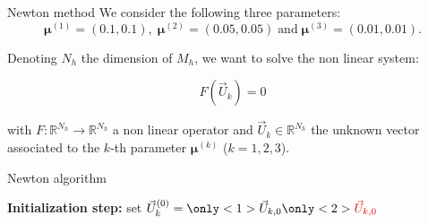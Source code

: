 \begin{frame}{Newton method}
	We consider the following three parameters:
	$$\bm{\mu}^{(1)} = (0.1,0.1), \; \bm{\mu}^{(2)} = (0.05,0.05) \; \text{and} \; \bm{\mu}^{(3)} = (0.01,0.01).$$

	Denoting $N_h$ the dimension of $M_h$, we want to solve the non linear system: %

    \normalsize
    \vspace{-10pt}
    \begin{equation*}
        F(\vec{U}_k) = 0 
    \end{equation*}

    with $F:\mathbb{R}^{N_h} \to \mathbb{R}^{N_h}$ a non linear operator and $\vec{U}_k\in \mathbb{R}^{N_h}$ the unknown vector associated to the $k$-th parameter $\bm{\mu}^{(k)}$ ($k=1,2,3$). \quad{}

	\setcounter{algocf}{0}
    \begin{center}
        \small
        \begin{minipage}{0.9\linewidth}
            \begin{algorithm}[H]
                \SetAlgoLined
                \caption{Newton algorithm \citep{newton_accel_2025}}
                \textbf{Initialization step:} set $\vec{U}_k^{(0)} = \only<1>{\vec{U}_{k,0}}\only<2>{\textcolor{darkred}{\vec{U}_{k,0}}}$\;
            \end{algorithm}
        \end{minipage}
    \end{center}
\end{frame}

